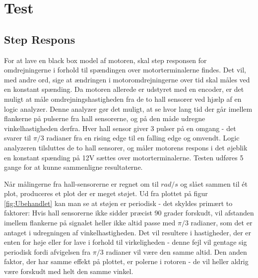\section{Test}

\subsection{Step Respons}

For at lave en black box model af motoren, skal step responsen for omdrejningerne i forhold til spændingen over motorterminalerne findes. Det vil, med andre ord, sige at ændringen i motoromdrejningerne over tid skal måles ved en konstant spænding. Da motoren allerede er udstyret med en encoder, er det muligt at måle omdrejningshastigheden fra de to hall sensorer ved hjælp af en logic analyzer. Denne analyzer gør det muligt, at se hvor lang tid der går imellem flankerne på pulserne fra hall sensorerne, og på den måde udregne vinkelhastigheden derfra. 
Hver hall sensor giver 3 pulser på en omgang - det svarer til $\pi/3$ radianer fra en rising edge til en falling edge og omvendt. Logic analyzeren tilsluttes de to hall sensorer, og måler motorens respons i det øjeblik en konstant spænding på 12V sættes over motorterminalerne. Testen udføres 5 gange for at kunne sammenligne resultaterne. 

Når målingerne fra hall-sensorerne er regnet om til $rad/s$ og slået sammen til ét plot, produceres et plot der er meget støjet. Ud fra plottet på figur \ref{fig:Ubehandlet} kan man se at støjen er periodisk - det skyldes primært to faktorer: Hvis hall sensorerne ikke sidder præcist 90 grader forskudt, vil afstanden imellem flankerne på signalet heller ikke altid passe med $\pi/3$ radianer, som det er antaget i udregningen af vinkelhastigheden. Det vil resultere i hastigheder, der er enten for høje eller for lave i forhold til virkeligheden - denne fejl vil gentage sig periodisk fordi afvigelsen fra $\pi/3$ radianer vil være den samme altid. Den anden faktor, der har samme effekt på plottet, er polerne i rotoren - de vil heller aldrig være forskudt med helt den samme vinkel.


